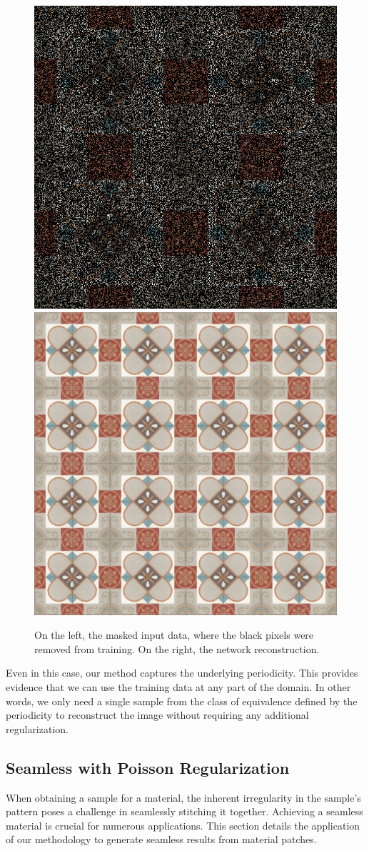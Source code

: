 \begin{figure}[!h]
\centering
\includegraphics[width=0.4\linewidth]{img/ch6/stochastic_mask.png}
\includegraphics[width=0.4\linewidth]{img/ch6/extrapolation_randommask.png}
\caption{On the left, the masked input data, where the black pixels were removed from training. On the right, the network reconstruction.~\\
}
\label{f:masked_recontruction}
\end{figure}

Even in this case, our method captures the underlying periodicity. This provides evidence that we can use the training data at any part of the domain. In other words, we only need a single sample from the class of equivalence defined by the periodicity to reconstruct the image without requiring any additional regularization.

\subsection{Seamless with Poisson Regularization}\label{s:poisson-regularization}

When obtaining a sample for a material, the inherent irregularity in the sample's pattern poses a challenge in seamlessly stitching it together. Achieving a seamless material is crucial for numerous applications. This section details the application of our methodology to generate seamless results from material patches.

